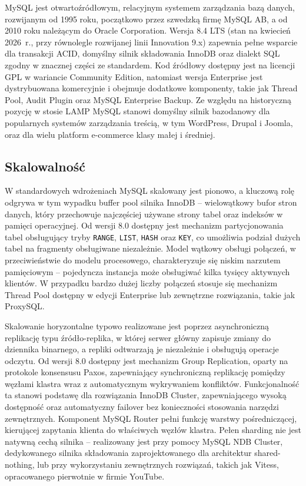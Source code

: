 MySQL jest otwartoźródłowym, relacyjnym systemem zarządzania bazą danych,
rozwijanym od 1995 roku, początkowo przez szwedzką firmę MySQL AB, a od 2010
roku należącym do Oracle Corporation. Wersja 8.4 LTS (stan na kwiecień 2026~r.,
przy równolegle rozwijanej linii Innovation 9.x) zapewnia pełne wsparcie dla
transakcji ACID, domyślny silnik składowania InnoDB oraz dialekt SQL zgodny
w znacznej części ze standardem. Kod źródłowy dostępny jest na licencji GPL
w wariancie Community Edition, natomiast wersja Enterprise jest dystrybuowana
komercyjnie i obejmuje dodatkowe komponenty, takie jak Thread Pool, Audit
Plugin oraz MySQL Enterprise Backup. Ze względu na historyczną pozycję w stosie
LAMP MySQL stanowi domyślny silnik bazodanowy dla popularnych systemów
zarządzania treścią, w tym WordPress, Drupal i Joomla, oraz dla wielu platform
e-commerce klasy małej i średniej.

\subsection{Skalowalność}

W standardowych wdrożeniach MySQL skalowany jest pionowo, a kluczową rolę
odgrywa w tym wypadku buffer pool silnika InnoDB -- wielowątkowy bufor stron
danych, który przechowuje najczęściej używane strony tabel oraz indeksów
w pamięci operacyjnej. Od wersji 8.0 dostępny jest mechanizm partycjonowania
tabel obsługujący tryby \texttt{RANGE}, \texttt{LIST}, \texttt{HASH} oraz
\texttt{KEY}, co umożliwia podział dużych tabel na fragmenty obsługiwane
niezależnie. Model wątkowy obsługi połączeń, w przeciwieństwie do modelu
procesowego, charakteryzuje się niskim narzutem pamięciowym -- pojedyncza
instancja może obsługiwać kilka tysięcy aktywnych klientów. W przypadku
bardzo dużej liczby połączeń stosuje się mechanizm Thread Pool dostępny
w edycji Enterprise lub zewnętrzne rozwiązania, takie jak ProxySQL.

Skalowanie horyzontalne typowo realizowane jest poprzez asynchroniczną
replikację typu źródło-replika, w której serwer główny zapisuje zmiany do
dziennika binarnego, a repliki odtwarzają je niezależnie i obsługują operacje
odczytu. Od wersji 8.0 dostępny jest mechanizm Group Replication, oparty na
protokole konsensusu Paxos, zapewniający synchroniczną replikację pomiędzy
węzłami klastra wraz z automatycznym wykrywaniem konfliktów. Funkcjonalność
ta stanowi podstawę dla rozwiązania InnoDB Cluster, zapewniającego wysoką
dostępność oraz automatyczny failover bez konieczności stosowania narzędzi
zewnętrznych. Komponent MySQL Router pełni funkcję warstwy pośredniczącej,
kierującej zapytania klienta do właściwych węzłów klastra. Pełen sharding
nie jest natywną cechą silnika -- realizowany jest przy pomocy MySQL NDB
Cluster, dedykowanego silnika składowania zaprojektowanego dla architektur
shared-nothing, lub przy wykorzystaniu zewnętrznych rozwiązań, takich jak
Vitess, opracowanego pierwotnie w firmie YouTube.

